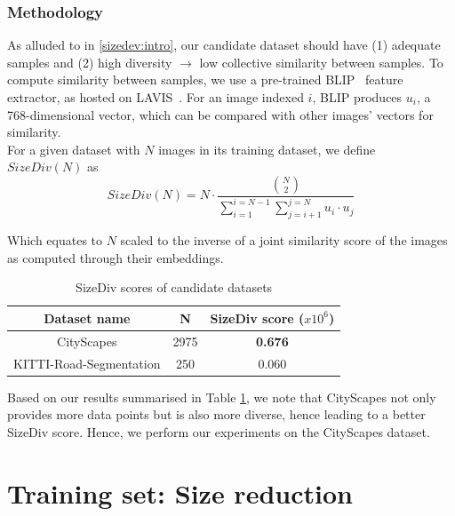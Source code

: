 \documentclass[letterpaper, 10 pt, conference]{ieeeconf}  %
\begin{document}
\subsubsection{Methodology}
As alluded to in \ref{sizedev:intro}, our candidate dataset should have (1) adequate samples and (2) high diversity $\rightarrow$ low collective similarity between samples. To compute similarity between samples, we use a pre-trained BLIP~\cite{DBLP:journals/corr/abs-2201-12086} feature extractor, as hosted on LAVIS~\cite{li-etal-2023-lavis}. For an image indexed $i$, BLIP produces $u_i$, a 768-dimensional vector, which can be compared with other images' vectors for similarity. \\
For a given dataset with $N$ images in its training dataset, we define $SizeDiv(N)$ as \\
\[ SizeDiv(N) = N \cdot \frac{{N \choose 2}}{\sum_{i=1}^{i=N-1} 
\sum_{j=i+1}^{j=N} u_i \cdot u_j} \]

Which equates to $N$ scaled to the inverse of a joint similarity score of the images as computed through their embeddings.

\begin{table}[!h]
\vspace{-2mm}
\caption{SizeDiv scores of candidate datasets}
\vspace{-4mm}
\label{sizediv:metrics}
\begin{center}
\begin{tabular}{|c|c|c|}
\hline
\textbf{Dataset name} & \textbf{N} & \textbf{SizeDiv score ($x 10^{6}$)} \\
\hline
CityScapes & 2975 & \textbf{0.676} \\
\hline
KITTI-Road-Segmentation & 250 & 0.060 \\
\hline
\end{tabular}
\end{center}
\vspace{-6mm}
\end{table}

Based on our results summarised in Table \ref{sizediv:metrics}, we note that CityScapes not only provides more data points but is also more diverse, hence leading to a better SizeDiv score.
Hence, we perform our experiments on the CityScapes dataset.
 
\section{Training set: Size reduction}
\label{hashing}
\end{document}
